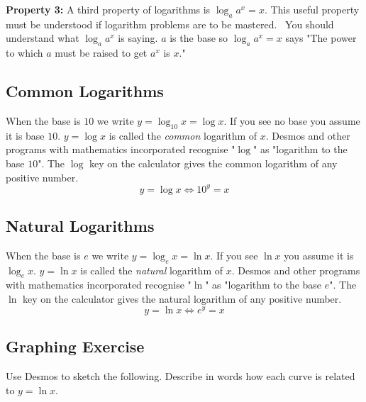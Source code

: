 \textbf{Property 3:} A third property
of logarithms is $\log _{a} a^{x} =x$. This useful property must be understood if logarithm problems are to be mastered.
\ You should understand what $\log _{a} a^{x}$ is saying. $a$ is the base so $\log _{a} a^{x} =x$ says "The power to which $a$ must be raised to get $a^{x}$ is $x$." 

\subsection{Common Logarithms}
When the base is $10$ we write $y =\log _{10} x =\log  x$. If you see no base you assume it is base $10$. $y =\log  x$ is called the \emph{common} logarithm of $x$. Desmos and other programs with mathematics incorporated recognise "$\log $" as "logarithm to the base $10$". The $\log $ key on the calculator gives the common logarithm of any positive number.
\begin{equation*}y =\log  x \Leftrightarrow 10^{y} =x
\end{equation*}

\subsection{Natural Logarithms}
When the base is $e$ we write $y =\log _{e} x =\ln  x$. If you see $\ln  x$ you assume it is $\log _{e} x$. $y =\ln  x$ is called the \emph{natural} logarithm of $x$. Desmos and other programs with mathematics incorporated recognise "$\ln $" as "logarithm to the base $e$". The $\ln $ key on the calculator gives the natural logarithm of any positive number.
\begin{equation*}y =\ln  x \Leftrightarrow e^{y} =x
\end{equation*}

\subsection{Graphing Exercise}
Use Desmos to sketch the following. Describe in words how each curve is related to $y =\ln  x$. 


